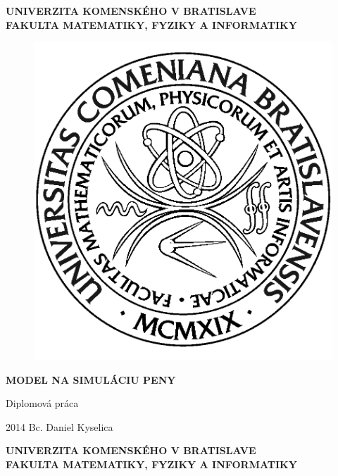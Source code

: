 \documentclass[12pt, a4paper, oneside]{book}
\newcommand\mftitle{Model na simuláciu peny}
\newcommand\mfthesistype{Diplomová práca}
\newcommand\mfauthor{Bc. Daniel Kyselica}
\newcommand\mfuniversity{UNIVERZITA KOMENSKÉHO V BRATISLAVE}
\newcommand\mffaculty{FAKULTA MATEMATIKY, FYZIKY A INFORMATIKY}
\begin{document}
\frontmatter

\thispagestyle{empty}

\noindent
\begin{minipage}{\textwidth}
\begin{center}
\textbf{\mfuniversity \\
\mffaculty}
\end{center}
\end{minipage}

\vfill
\begin{figure}[!hbt]
	\begin{center}
		\includegraphics{images/logo_fmph}
		\label{img:logo}
	\end{center}
\end{figure}
\begin{center}
	\begin{minipage}{0.8\textwidth}
		\centerline{\textbf{\Large\MakeUppercase{\mftitle}}}
		\smallskip
		\centerline{\mfthesistype}
	\end{minipage}
\end{center}
\vfill
2014 \hfill
\mfauthor
\eject 

\thispagestyle{empty}

\noindent
\begin{minipage}{\textwidth}
\begin{center}
\textbf{\mfuniversity \\
\mffaculty}
\end{center}
\end{minipage}
\end{document}
